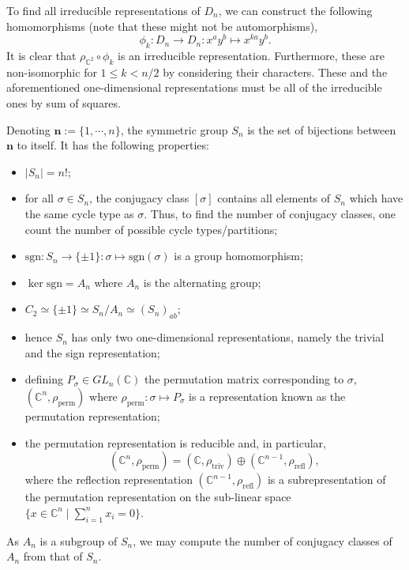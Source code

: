 \documentclass[]{article}
\theoremstyle{definition}
\begin{document}
To find all irreducible representations of \(D_n\), we can construct the following 
homomorphisms (note that these might not be automorphisms), 
\[\phi_k : D_n \to D_n : x^a y^b \mapsto x^{ka}y^b.\]
It is clear that \(\rho_{\mathbb{C}^2} \circ \phi_k\) is an irreducible representation. 
Furthermore, these are non-isomorphic for \(1 \le k < n / 2\) by considering their characters. 
These and the aforementioned one-dimensional representations must be all of the irreducible ones 
by sum of squares. 

Denoting \(\mathbf{n} := \{1, \cdots, n\}\), the symmetric group \(S_n\) is the set of bijections 
between \(\mathbf{n}\) to itself. It has the following properties:
\begin{itemize}
  \item \(|S_n| = n!\);
  \item for all \(\sigma \in S_n\), the conjugacy class \([\sigma]\) contains all elements of \(S_n\) 
    which have the same cycle type as \(\sigma\). Thus, to find the number of conjugacy classes, 
    one count the number of possible cycle types/partitions; 
  \item \(\text{sgn} : S_n \to \{\pm 1\} : \sigma \mapsto \text{sgn}(\sigma)\) is a group homomorphism;
  \item \(\ker \text{sgn} = A_n\)  where \(A_n\) is the alternating group;
  \item \(C_2 \simeq \{\pm 1\} \simeq S_n / A_n \simeq (S_n)_{ab}\); 
  \item hence \(S_n\) has only two one-dimensional representations, namely the trivial and the sign 
    representation;
  \item defining \(P_\sigma \in GL_n(\mathbb{C})\) the permutation matrix corresponding to \(\sigma\),
    \((\mathbb{C}^n, \rho_{\text{perm}})\) where \(\rho_{\text{perm}} : \sigma \mapsto P_{\sigma}\) is 
    a representation known as the permutation representation;
  \item the permutation representation is reducible and, in particular,
    \[(\mathbb{C}^n, \rho_{\text{perm}}) = (\mathbb{C}, \rho_{\text{triv}}) \oplus 
      (\mathbb{C}^{n - 1}, \rho_{\text{refl}}),\]
    where the reflection representation \((\mathbb{C}^{n - 1}, \rho_{\text{refl}})\) is 
    a subrepresentation of the permutation representation on the sub-linear space 
    \(\{x \in \mathbb{C}^n \mid \sum_{i = 1}^n x_i = 0\}\).
\end{itemize}

As \(A_n\) is a subgroup of \(S_n\), we may compute the number of conjugacy classes of 
\(A_n\) from that of \(S_n\). 
\end{document}

